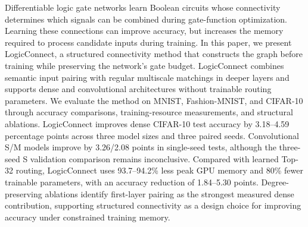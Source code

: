 Differentiable logic gate networks learn Boolean circuits whose connectivity determines which signals can be combined during gate-function optimization. Learning these connections can improve accuracy, but increases the memory required to process candidate inputs during training. In this paper, we present LogicConnect, a structured connectivity method that constructs the graph before training while preserving the network's gate budget. LogicConnect combines semantic input pairing with regular multiscale matchings in deeper layers and supports dense and convolutional architectures without trainable routing parameters. We evaluate the method on MNIST, Fashion-MNIST, and CIFAR-10 through accuracy comparisons, training-resource measurements, and structural ablations. LogicConnect improves dense CIFAR-10 test accuracy by 3.18–4.59 percentage points across three model sizes and three paired seeds. Convolutional S/M models improve by 3.26/2.08 points in single-seed tests, although the three-seed S validation comparison remains inconclusive. Compared with learned Top-32 routing, LogicConnect uses 93.7–94.2\% less peak GPU memory and 80\% fewer trainable parameters, with an accuracy reduction of 1.84–5.30 points. Degree-preserving ablations identify first-layer pairing as the strongest measured dense contribution, supporting structured connectivity as a design choice for improving accuracy under constrained training memory.
